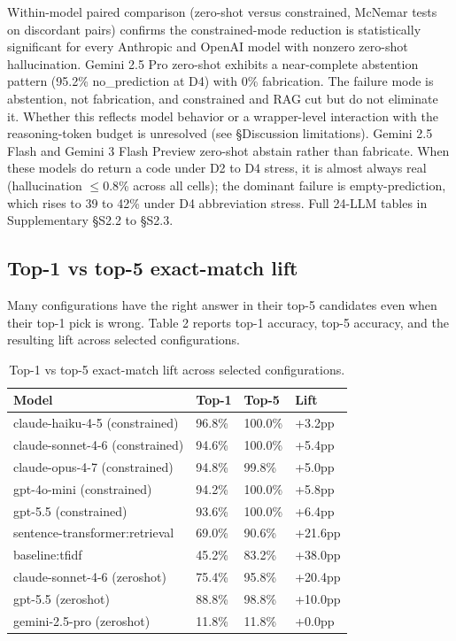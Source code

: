 Within-model paired comparison (zero-shot versus constrained,
McNemar tests on discordant pairs) confirms the constrained-mode
reduction is statistically significant for every Anthropic and
OpenAI model with nonzero zero-shot hallucination. Gemini 2.5 Pro
zero-shot exhibits a near-complete abstention pattern (95.2\%
no\_prediction at D4) with 0\% fabrication. The failure mode is
abstention, not fabrication, and constrained and RAG cut but do
not eliminate it. Whether this reflects model behavior or a
wrapper-level interaction with the reasoning-token budget is
unresolved (see §Discussion limitations). Gemini 2.5 Flash and
Gemini 3 Flash Preview zero-shot abstain rather than fabricate.
When these models do return a code under D2 to D4 stress, it is
almost always real (hallucination $\leq$0.8\% across all cells); the
dominant failure is empty-prediction, which rises to 39 to 42\%
under D4 abbreviation stress. Full 24-LLM tables in Supplementary
§S2.2 to §S2.3.

\subsection{Top-1 vs top-5 exact-match lift}\label{top-1-vs-top-5-exact-match-lift}

Many configurations have the right answer in their top-5
candidates even when their top-1 pick is wrong. Table 2 reports
top-1 accuracy, top-5 accuracy, and the resulting lift across
selected configurations.

\begin{table}[!t]
\centering
\caption{Top-1 vs top-5 exact-match lift across selected configurations.}
\begin{tabular}{@{}llll@{}}
\toprule
Model & Top-1 & Top-5 & Lift \\
\midrule
claude-haiku-4-5 (constrained) & 96.8\% & 100.0\% & +3.2pp \\
claude-sonnet-4-6 (constrained) & 94.6\% & 100.0\% & +5.4pp \\
claude-opus-4-7 (constrained) & 94.8\% & 99.8\% & +5.0pp \\
gpt-4o-mini (constrained) & 94.2\% & 100.0\% & +5.8pp \\
gpt-5.5 (constrained) & 93.6\% & 100.0\% & +6.4pp \\
sentence-transformer:retrieval & 69.0\% & 90.6\% & +21.6pp \\
baseline:tfidf & 45.2\% & 83.2\% & +38.0pp \\
claude-sonnet-4-6 (zeroshot) & 75.4\% & 95.8\% & +20.4pp \\
gpt-5.5 (zeroshot) & 88.8\% & 98.8\% & +10.0pp \\
gemini-2.5-pro (zeroshot) & 11.8\% & 11.8\% & +0.0pp \\
\bottomrule
\end{tabular}
\end{table}

